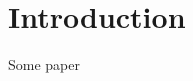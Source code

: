 \documentclass[letterpaper]{article}
\begin{document}
	\maketitle

	\pagestyle{fancy}

	\thispagestyle{empty}

	\begin{abstract}
		\lipsum[1]
	\end{abstract}
	
	\section{Introduction}
	
	\lipsum[1]

	\medskip


	Some paper \cite{einstein, dirac}

	\printbibliography


	\lipsum[1]
\end{document}
